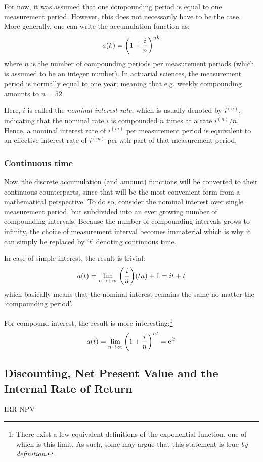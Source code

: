 For now, it was assumed that one compounding period is equal to one measurement period. However, this does not necessarily have to be the case. More generally, one can write the accumulation function as:
\[
     a(k) = \qty(1 + \frac{i}{n})^{nk}
\]
where \(n\) is the number of compounding periods per measurement periods (which is assumed to be an integer number). In actuarial sciences, the measurement period is normally equal to one year; meaning that e.g. weekly compounding amounts to \(n = 52\).

Here, \(i\) is called the \emph{nominal interest rate}, which is usually denoted by \(i^{(n)}\), indicating that the nominal rate \(i\) is compounded \(n\) times at a rate \(i^{(n)}/n\). Hence, a nominal interest rate of \(i^{(m)}\) per measurement period is equivalent to an effective interest rate of \( i^{(m)}\) per \(n\)th part of that measurement period. 


\subsubsection{Continuous time}
Now, the discrete accumulation (and amount) functions will be converted to their continuous counterparts, since that will be the most convenient form from a mathematical perspective. To do so, consider the nominal interest over single measurement period, but subdivided into an ever growing number of compounding intervals. Because the number of compounding intervals grows to infinity, the choice of measurement interval becomes immaterial which is why it can simply be replaced by `\(t\)' denoting continuous time.

In case of simple interest, the result is trivial:
 \[
     a(t) = \lim_{n \to +\infty} \qty(\frac{i}{n}) (tn) + 1 = it + t
\]
which basically means that the nominal interest remains the same no matter the `compounding period'.

For compound interest, the result is more interesting:\footnote{There exist a few equivalent definitions of the exponential function, one of which is this limit. As such, some may argue that this statement is true \emph{by definition}.}
 \[
     a(t) = \lim_{n \to \infty} \qty(1 + \frac{i}{n})^{nt} = \mathrm{e}^{it}
\]
 
\subsection{Discounting, Net Present Value and the Internal Rate of Return}
\ac{IRR}
\ac{NPV}


